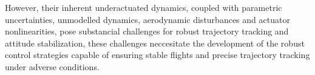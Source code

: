 However, their inherent underactuated dynamics, coupled with parametric uncertainties, unmodelled dynamics, aerodynamic disturbances and actuator nonlinearities, pose substancial challenges for robust trajectory tracking and attitude stabilization,
 these challenges  neccesitate the development of the robust control strategies capable of ensuring stable flights and precise trajectory tracking under adverse conditions.
    
    



